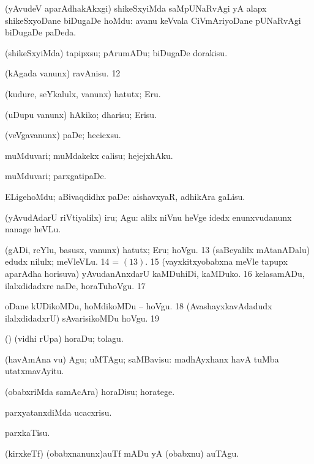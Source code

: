 {{ (yAvudeV aparAdhakAkxgi) shikeSxyiMda saMpUNaRvAgi yA alapx
shikeSxyoDane biDugaDe hoMdu:  avanu keVvala CiVmAriyoDane pUNaRvAgi biDugaDe paDeda. 

 (shikeSxyiMda) tapipxsu; pArumADu; biDugaDe dorakisu.

 (kAgada \mo vanunx) ravAnisu. 
\hypertarget{get pagu12}{}
\num{12}  

 (kudure, seYkalulx, \mo vanunx) hatutx; Eru. 

 (uDupu \mo vanunx) hAkiko; dharisu; Erisu. 

 (veVgavanunx) paDe; hecicxsu. 

 muMduvari; muMdakekx calisu; hejejxhAku. 

 muMduvari; parxgatipaDe. 

 ELigehoMdu;  aBivaqdidhx paDe: 
  aishavxyaR, adhikAra gaLisu.

 (yAvudAdarU riVtiyalilx) iru; Agu:  alilx niVnu heVge idedx enunxvudanunx nanage heVLu.

 (gADi, reYlu, basusx, \mo vanunx) hatutx; Eru; hoVgu. 
 \hypertarget{get pagu13}{}
\num{13}  (saBeyalilx
mAtanADalu) edudx nilulx; meVleVLu.
\num{14}  =
  \hyperlink{get pagu13}{\pagu $(13)$}. 
\num{15}  (vayxkitxyobabxna
meVle tapupx aparAdha horisuva) yAvudanAnxdarU kaMDuhiDi, kaMDuko.
\num{16}  kelasamADu, ilalxdidadxre naDe, horaTuhoVgu. 
\num{17}  

 oDane kUDikoMDu, hoMdikoMDu -- hoVgu.
\num{18}  (AvashayxkavAdadudx ilalxdidadxrU) sAvarisikoMDu hoVgu. 
\num{19}  

 (\AmA) (vidhi rUpa) horaDu; tolagu. 

 (havAmAna \mo vu) Agu; uMTAgu; saMBavisu:  madhAyxhanx havA tuMba utatxmavAyitu.

 (obabxriMda samAcAra) horaDisu; horatege. 

 parxyatanxdiMda ucacxrisu. 

 parxkaTisu. 

 (kirxkeTf) (obabxnanunx)auTf mADu yA (obabxnu) auTAgu. 

}}
